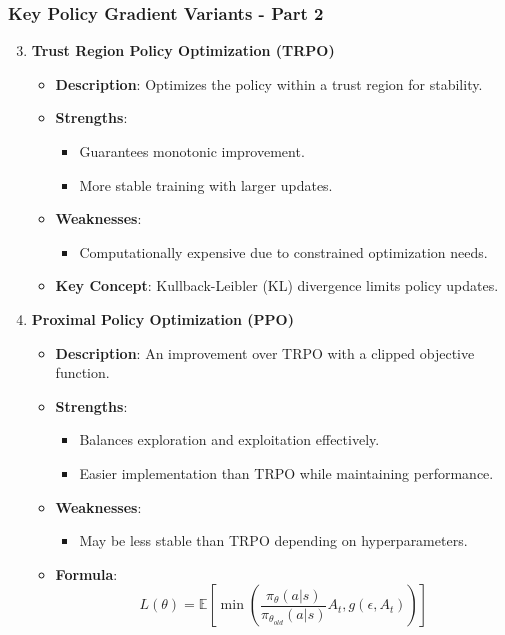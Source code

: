 \documentclass{beamer}
\begin{document}
\begin{frame}[fragile]
    \frametitle{Key Policy Gradient Variants - Part 2}
    \begin{enumerate}
        \setcounter{enumi}{2} %

        \item \textbf{Trust Region Policy Optimization (TRPO)}
        \begin{itemize}
            \item \textbf{Description}: Optimizes the policy within a trust region for stability.
            \item \textbf{Strengths}: 
            \begin{itemize}
                \item Guarantees monotonic improvement.
                \item More stable training with larger updates.
            \end{itemize}
            \item \textbf{Weaknesses}: 
            \begin{itemize}
                \item Computationally expensive due to constrained optimization needs.
            \end{itemize}
            \item \textbf{Key Concept}: Kullback-Leibler (KL) divergence limits policy updates.
        \end{itemize}

        \item \textbf{Proximal Policy Optimization (PPO)}
        \begin{itemize}
            \item \textbf{Description}: An improvement over TRPO with a clipped objective function.
            \item \textbf{Strengths}: 
            \begin{itemize}
                \item Balances exploration and exploitation effectively.
                \item Easier implementation than TRPO while maintaining performance.
            \end{itemize}
            \item \textbf{Weaknesses}: 
            \begin{itemize}
                \item May be less stable than TRPO depending on hyperparameters.
            \end{itemize}
            \item \textbf{Formula}:
            \begin{equation}
                L(\theta) = \mathbb{E} \left[ \min \left( \frac{\pi_\theta(a|s)}{\pi_{\theta_{old}}(a|s)} A_t, g(\epsilon, A_t) \right) \right]
            \end{equation}
        \end{itemize}
    \end{enumerate}
\end{frame}
\end{document}
